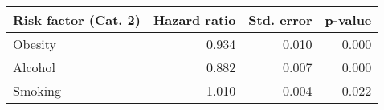 \begin{tabular}{lrrr}
\toprule
Risk factor (Cat. 2) & Hazard ratio & Std. error & p-value \\ 
\midrule
Obesity & 0.934 & 0.010 & 0.000 \\ 
Alcohol & 0.882 & 0.007 & 0.000 \\ 
Smoking & 1.010 & 0.004 & 0.022 \\ 
\bottomrule
\end{tabular}

